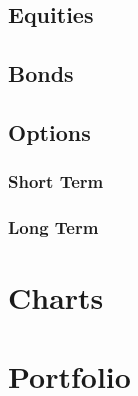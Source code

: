 \documentclass[12pt, oneside]{report}
\begin{document}
\section{Equities}
\section{Bonds}
\section{Options}
\subsection{Short Term}
\subsection{Long Term}

\chapter{Charts}
\chapter{Portfolio}
\end{document}
